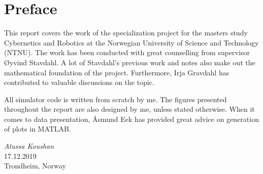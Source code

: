 \chapter{Preface}

This report covers the work of the specialization project for the masters study Cybernetics and Robotics at the Norwegian University of Science and Technology (NTNU). 
The work has been conducted with great counselling from supervisor Øyvind Stavdahl. A lot of Stavdahl's previous work and notes also make out the mathematical foundation of the project. 
Furthermore, Irja Gravdahl has contributed to valuable discussions on the topic.

All simulator code is written from scratch by me. The figures presented throughout the report are also designed by me, unless stated otherwise. When it comes to data presentation, Åsmund Eek has provided great advice on generation of plots in MATLAB.


\medskip
\begin {flushright}
  \textit{Atussa Koushan} \\
  \textsc {17.12.2019} \\
  Trondheim, Norway
\end {flushright}



\makeatletter
{}


\makeatother




